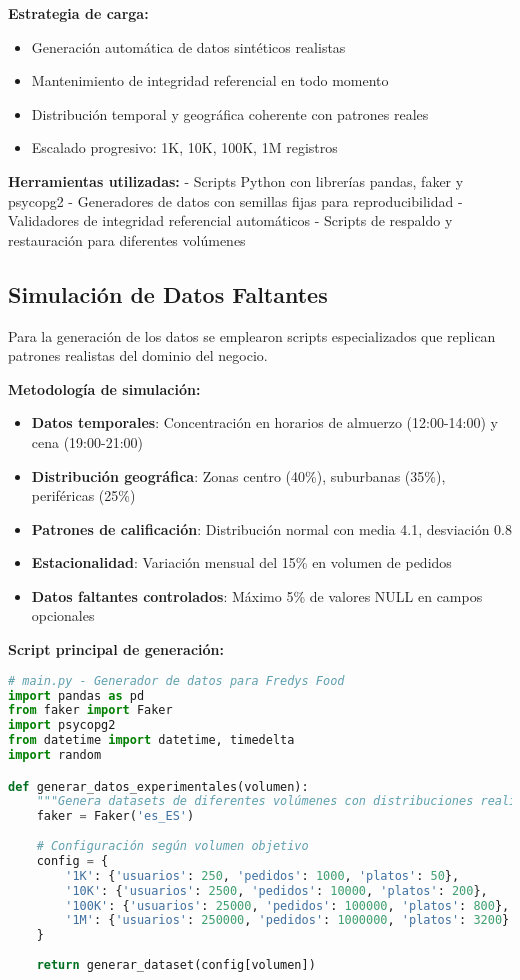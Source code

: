 \documentclass[12pt,a4paper]{article}
\begin{document}
\textbf{Estrategia de carga:}
\begin{itemize}
    \item Generación automática de datos sintéticos realistas
    \item Mantenimiento de integridad referencial en todo momento
    \item Distribución temporal y geográfica coherente con patrones reales
    \item Escalado progresivo: 1K, 10K, 100K, 1M registros
\end{itemize}

\textbf{Herramientas utilizadas:}
- Scripts Python con librerías pandas, faker y psycopg2
- Generadores de datos con semillas fijas para reproducibilidad
- Validadores de integridad referencial automáticos
- Scripts de respaldo y restauración para diferentes volúmenes

\subsection{Simulación de Datos Faltantes}
Para la generación de los datos se emplearon scripts especializados que replican patrones realistas del dominio del negocio.

\textbf{Metodología de simulación:}
\begin{itemize}
    \item \textbf{Datos temporales}: Concentración en horarios de almuerzo (12:00-14:00) y cena (19:00-21:00)
    \item \textbf{Distribución geográfica}: Zonas centro (40\%), suburbanas (35\%), periféricas (25\%)
    \item \textbf{Patrones de calificación}: Distribución normal con media 4.1, desviación 0.8
    \item \textbf{Estacionalidad}: Variación mensual del 15\% en volumen de pedidos
    \item \textbf{Datos faltantes controlados}: Máximo 5\% de valores NULL en campos opcionales
\end{itemize}

\textbf{Script principal de generación:}
\begin{lstlisting}[language=Python]
# main.py - Generador de datos para Fredys Food
import pandas as pd
from faker import Faker
import psycopg2
from datetime import datetime, timedelta
import random

def generar_datos_experimentales(volumen):
    """Genera datasets de diferentes volúmenes con distribuciones realistas"""
    faker = Faker('es_ES')
    
    # Configuración según volumen objetivo
    config = {
        '1K': {'usuarios': 250, 'pedidos': 1000, 'platos': 50},
        '10K': {'usuarios': 2500, 'pedidos': 10000, 'platos': 200},
        '100K': {'usuarios': 25000, 'pedidos': 100000, 'platos': 800},
        '1M': {'usuarios': 250000, 'pedidos': 1000000, 'platos': 3200}
    }
    
    return generar_dataset(config[volumen])
\end{lstlisting}
\end{document}
